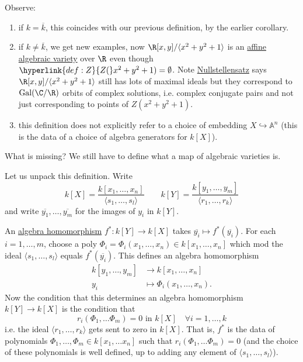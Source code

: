 \documentclass{article}
\newcommand{\A}{\mathbb{A}}
\DeclareMathOperator{\Mor}{Mor}
\DeclareMathOperator{\Gal}{Gal}
\begin{document}
Observe:
\begin{enumerate}[label=(\roman*)]
    \item if $k = \overline{k}$, this coincides with our previous definition, by the earlier corollary.
    \item if $k \neq \overline{k}$, we get new examples, now $\R[x,y]/\langle x^2 + y^2 + 1 \rangle$ is an \hyperlink{def:affineVariety}{affine algebraic variety} over $\R$ even though $\hyperlink{def:Z}{Z(}x^2 + y^2 + 1) = \emptyset$.
        Note \hyperlink{def:null1}{Nullstellensatz} says $\R[x,y]/\langle x^2 + y^2 + 1 \rangle$ still has lots of maximal ideals but they correspond to $\Gal(\C/\R)$ orbits of complex solutions, i.e. complex conjugate pairs and not just corresponding to points of $Z(x^2 + y^2 + 1)$.
    \item this definition does not explicitly refer to a choice of embedding $X \hookrightarrow \A^n$ (this is the data of a choice of algebra generators for $k[X]$).
\end{enumerate}
What is missing? We still have to define what a map of algebraic varieties is.
Let us unpack this definition.
Write
\begin{equation*}
    k[X] = \frac{k[x_1, \dotsc, x_n]}{\langle s_1, \dotsc, s_l \rangle} \qquad k[Y] = \frac{k[y_1, \dotsc, y_m]}{\langle r_1, \dotsc, r_k \rangle}
\end{equation*}
and write $\overline{y_1}, \dotsc, \overline{y_m}$ for the images of $y_i$ in $k[Y]$.

An \hyperlink{def:algHom}{algebra homomorphism} $f^*: k[Y] \to k[X]$ takes $\overline{y_i} \mapsto f^*(\overline{y_i})$.
For each $i=1,\dotsc,m$, choose a poly $\Phi_i = \Phi_i(x_1, \dotsc, x_n) \in k[x_1, \dotsc, x_n]$ which mod the ideal $\langle s_1, \dotsc, s_l \rangle$ equals $f^*(\overline{y_i})$.
This defines an algebra homomorphism
\begin{align*}
    k[y_1, \dotsc, y_m] &\longrightarrow k[x_1, \dotsc, x_n] \\
    y_i &\longmapsto \Phi_i(x_1, \dotsc, x_n).
\end{align*}
Now the condition that this determines an algebra homomorphism $k[Y] \to k[X]$ is the condition that
\begin{equation*}r_i(\Phi_1, \dotsc \Phi_m) = 0 \text{ in } k[X] \quad \forall i=1,\dotsc,k\end{equation*}
i.e. the ideal $\langle r_1, \dotsc, r_k\rangle$ gets sent to zero in $k[X]$.
That is, $f^*$ is the data of polynomials $\Phi_1, \dotsc, \Phi_m \in k[x_1, \dotsc x_n]$ such that $r_i(\Phi_1, \dotsc \Phi_m) = 0$ (and the choice of these polynomials is well defined, up to adding any element of $\langle s_1, \dotsc, s_l\rangle$).
\end{document}
